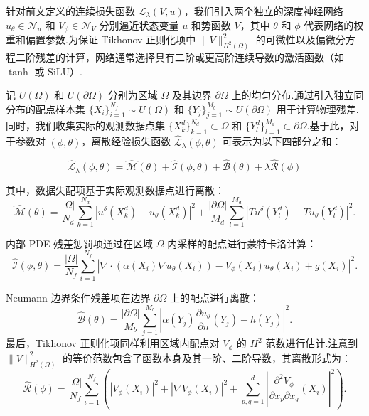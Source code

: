针对前文定义的连续损失函数 $\mathcal{L}_{\lambda}(V,u)$，我们引入两个独立的深度神经网络 $u_{\theta} \in \mathcal{N}_{u}$ 和 $V_{\phi} \in \mathcal{N}_{V}$ 分别逼近状态变量 $u$ 和势函数 $V$，其中 $\theta$ 和 $\phi$ 代表网络的权重和偏置参数.为保证 Tikhonov 正则化项中 $\|V\|_{H^2(\Omega)}^2$ 的可微性以及偏微分方程二阶残差的计算，网络通常选择具有二阶或更高阶连续导数的激活函数（如 $\tanh$ 或 $\mathrm{SiLU}$）.

记 $U(\Omega)$ 和 $U(\partial\Omega)$ 分别为区域 $\Omega$ 及其边界 $\partial\Omega$ 上的均匀分布.通过引入独立同分布的配点样本集 $\{X_{i}\}_{i=1}^{N_f}\sim U(\Omega)$ 和 $\{Y_{j}\}_{j=1}^{M_b}\sim U(\partial\Omega)$ 用于计算物理残差.同时，我们收集实际的观测数据点集 $\{X_{k}^{d}\}_{k=1}^{N_d} \subset \Omega$ 和 $\{Y_{l}^{d}\}_{l=1}^{M_d} \subset \partial\Omega$.基于此，对于参数对 $(\phi, \theta)$，离散经验损失函数 $\widehat{\mathcal{L}}_{\lambda}(\phi, \theta)$ 可表示为以下四部分之和：

\begin{equation}\label{eq:empirical:loss}
\widehat{\mathcal{L}}_{\lambda}(\phi, \theta) = \widehat{\mathcal{M}}(\theta) + \widehat{\mathcal{I}}(\phi, \theta) + \widehat{\mathcal{B}}(\theta) + \lambda\widehat{\mathcal{R}}(\phi) 
\end{equation}

其中，数据失配项基于实际观测数据点进行离散：
$$\widehat{\mathcal{M}}(\theta) = \frac{|\Omega|}{N_d}\sum_{k=1}^{N_d}|u^{\delta}(X_{k}^{d}) - u_{\theta}(X_{k}^{d})|^2 + \frac{|\partial\Omega|}{M_d}\sum_{l=1}^{M_d}|Tu^{\delta}(Y_{l}^{d}) - Tu_{\theta}(Y_{l}^{d})|^2.$$

内部 PDE 残差惩罚项通过在区域 $\Omega$ 内采样的配点进行蒙特卡洛计算：
$$\widehat{\mathcal{I}}(\phi, \theta) = \frac{|\Omega|}{N_f}\sum_{i=1}^{N_f} \left| \nabla \cdot (\alpha(X_{i}) \nabla u_{\theta}(X_{i})) - V_{\phi}(X_{i})u_{\theta}(X_{i}) + g(X_{i}) \right|^2.$$

Neumann 边界条件残差项在边界 $\partial\Omega$ 上的配点进行离散：
$$\widehat{\mathcal{B}}(\theta) = \frac{|\partial\Omega|}{M_b}\sum_{j=1}^{M_b} \left| \alpha(Y_{j})\frac{\partial u_{\theta}}{\partial n}(Y_{j}) - h(Y_{j}) \right|^2.$$
最后，Tikhonov 正则化项同样利用区域内配点对 $V_\phi$ 的 $H^2$ 范数进行估计.注意到 $\|V\|_{H^2(\Omega)}^2$ 的等价范数包含了函数本身及其一阶、二阶导数，其离散形式为：
$$\widehat{\mathcal{R}}(\phi) = \frac{|\Omega|}{N_f}\sum_{i=1}^{N_f} \left( |V_{\phi}(X_{i})|^2 + |\nabla V_{\phi}(X_{i})|^2 + \sum_{p,q=1}^{d} \left| \frac{\partial^2 V_{\phi}}{\partial x_p \partial x_q}(X_{i}) \right|^2 \right).$$

